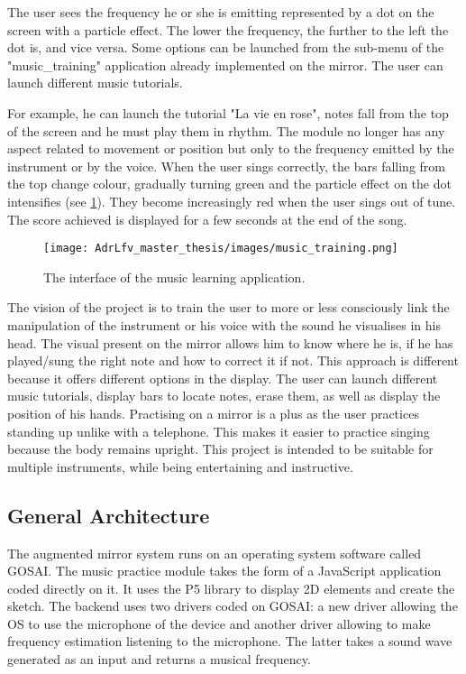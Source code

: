 The user sees the frequency he or she is emitting represented by a dot on the screen with a particle effect. The lower the frequency, the further to the left the dot is, and vice versa. Some options can be launched from the sub-menu of the "music\_training" application already
implemented on the mirror. The user can launch different music tutorials.

For example, he can launch the tutorial "La vie en rose", notes fall from the top of the screen and he must play them in rhythm. The module no longer has any aspect related to movement or position but only to the frequency emitted by the instrument or by the voice.
When the user sings correctly, the bars falling from the top change colour, gradually turning green and the particle effect on the dot intensifies (see \ref{fig:music_training}). They become increasingly red when the user sings out of tune. The score achieved is displayed for a few seconds at the end of the song.

\begin{figure}[h]
    \centering
    \texttt{[image: AdrLfv\_master\_thesis/images/music\_training.png]}
    \caption{The interface of the music learning application.}
    \label{fig:music_training}
\end{figure}

The vision of the project is to train the user to more or less consciously link the manipulation of the instrument or his voice with the sound he visualises in his head. The visual present on the mirror allows him to know where he is, if he has played/sung the right note and how to correct it if not.
This approach is different because it offers different options in the display. The user can launch different music tutorials, display bars to locate notes, erase them, as well as display the position of his hands.
Practising on a mirror is a plus as the user practices standing up unlike with a telephone. This makes it easier to practice singing because the body remains upright. This project is intended to be suitable for multiple instruments, while being entertaining and instructive.

\subsection{General Architecture}

The augmented mirror system runs on an operating system software called GOSAI. The music practice module takes the form of a JavaScript application coded directly on it. It uses the P5 library to display 2D elements and create the sketch. The backend uses two drivers coded on GOSAI: a new driver allowing the OS to use the microphone of the device and another driver allowing to make frequency estimation listening to the microphone. The latter takes a sound wave generated as an input and returns a musical frequency.

